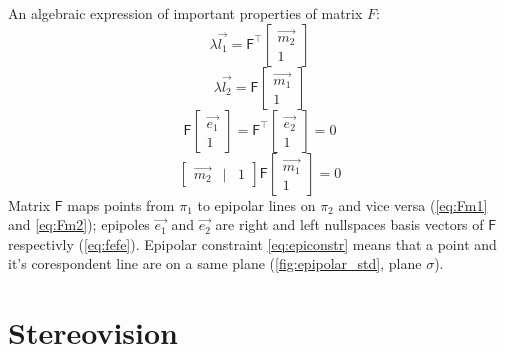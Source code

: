 An algebraic expression of important properties of matrix $F$:
\begin{equation}
    \label{eq:Fm2}
    \lambda \vec{l_1} = \pmb{\mathsf{F}}^\top \begin{bmatrix} \vec{m_2} \\ 1 \end{bmatrix}    
\end{equation}
\begin{equation}
    \label{eq:Fm1}
    \lambda \vec{l_2} = \pmb{\mathsf{F}} \begin{bmatrix} \vec{m_1} \\ 1 \end{bmatrix}
\end{equation}
\begin{equation}
    \label{eq:fefe}
    \pmb{\mathsf{F}} \begin{bmatrix} \vec{e_1} \\ 1 \end{bmatrix} = \pmb{\mathsf{F}}^\top \begin{bmatrix} \vec{e_2} \\ 1 \end{bmatrix} = 0    
\end{equation}
\begin{equation}
    \label{eq:epiconstr}
    \begin{bmatrix} \vec{m_2} & | & 1 \end{bmatrix} \pmb{\mathsf{F}} \begin{bmatrix} \vec{m_1} \\ 1 \end{bmatrix} = 0    
\end{equation}
Matrix $\pmb{\mathsf{F}}$ maps points from $\pi_1$ to epipolar lines on $\pi_2$ and vice versa (\autoref{eq:Fm1} and \autoref{eq:Fm2}); epipoles $\vec{e_1}$ and $\vec{e_2}$ are right and left nullspaces basis vectors of $\pmb{\mathsf{F}}$ respectivly (\autoref{eq:fefe}).
Epipolar constraint \autoref{eq:epiconstr} means that a point and it's corespondent line are on a same plane (\autoref{fig:epipolar_std}, plane $\sigma$).

\section{Stereovision}

